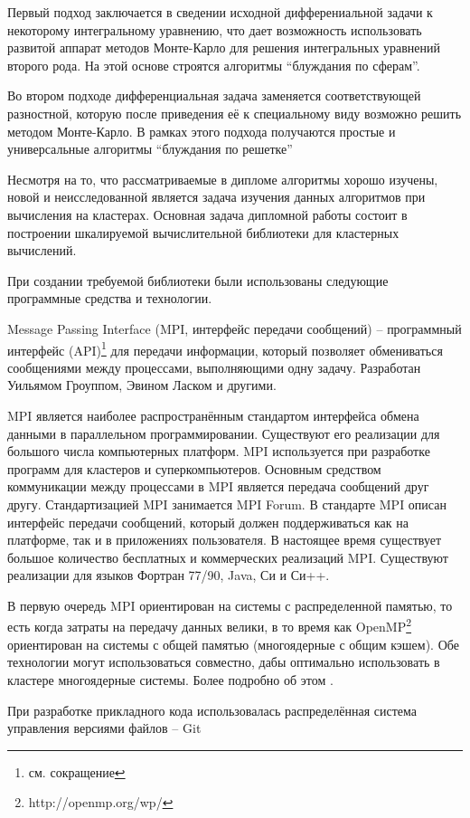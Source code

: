 Первый подход заключается в сведении исходной дифферениальной задачи к некоторому интегральному уравнению, что дает возможность использовать развитой аппарат методов Монте-Карло для решения интегральных уравнений второго рода. На этой основе строятся алгоритмы ``блуждания по сферам''.
   
Во втором подходе дифференциальная задача заменяется соответствующей разностной,
которую после приведения её к специальному виду возможно решить
методом Монте-Карло. В рамках этого подхода получаются простые и универсальные алгоритмы ``блуждания по решетке''

Несмотря на то, что рассматриваемые в дипломе алгоритмы хорошо изучены, новой и неисследованной является задача изучения данных алгоритмов при вычисления на кластерах. Основная задача дипломной работы состоит в  построении шкалируемой вычислительной библиотеки для кластерных вычислений.  

При создании требуемой библиотеки были использованы следующие программные средства и технологии.   

Message Passing Interface (MPI, интерфейс передачи сообщений) -- программный интерфейс (API)\footnote{см. сокращение} для передачи информации, который позволяет обмениваться сообщениями между процессами, выполняющими одну задачу. Разработан Уильямом Гроуппом, Эвином Ласком и другими.

MPI является наиболее распространённым стандартом интерфейса обмена данными в параллельном программировании. Существуют его реализации для большого числа компьютерных платформ. MPI используется при разработке программ для кластеров и суперкомпьютеров. Основным средством коммуникации между процессами в MPI является передача сообщений друг другу. Стандартизацией MPI занимается MPI Forum. В стандарте MPI описан интерфейс передачи сообщений, который должен поддерживаться как на платформе, так и в приложениях пользователя. В настоящее время существует большое количество бесплатных и коммерческих реализаций MPI. Существуют реализации для языков Фортран 77/90, Java, Си и Си++.

В первую очередь MPI ориентирован на системы с распределенной памятью, то есть когда затраты на передачу данных велики, в то время как OpenMP\footnote{http://openmp.org/wp/} ориентирован на системы с общей памятью (многоядерные с общим кэшем). Обе технологии могут использоваться совместно, дабы оптимально использовать в кластере многоядерные системы. Более подробно об этом \cite{mpi:offsite}.

При разработке прикладного кода использовалась распределённая система управления версиями файлов -- Git

